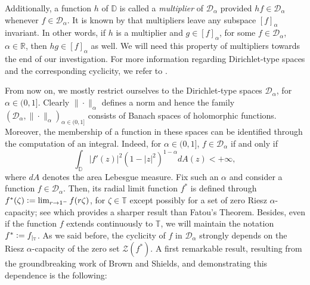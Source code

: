 \documentclass[12pt]{amsart}
\theoremstyle{definition}\newtheorem{remark}[theorem]{Remark}
\theoremstyle{definition}\newtheorem{example}[theorem]{Example}
\theoremstyle{definition}\newtheorem{definition}{Definition}
\numberwithin{equation}{section}
\newcommand\cD{{\mathcal D}}
\newcommand\RR{{\mathbb R}}
\newcommand\DD{{\mathbb D}}
\newcommand\TT{{\mathbb T}}
\begin{document}
Additionally, a function $h$ of $\DD$ is called a \textit{multiplier} of $\cD_\alpha$ provided $hf\in\cD_\alpha$ whenever $f\in\cD_\alpha$. It is known by \cite[Proposition 7]{Brown-Shields} that multipliers leave any subspace $[f]_\alpha$ invariant. In other words, if $h$ is a multiplier and $g\in[f]_\alpha$, for some $f\in\cD_\alpha$, $\alpha\in\RR$, then $hg\in[f]_\alpha$ as well. We will need this property of multipliers towards the end of our investigation. For more information regarding Dirichlet-type spaces and the corresponding cyclicity, we refer to \cite{Aleman1, Beurling, Brown-Shields, Primer, Mironov, Richter1, Richter-Shields, Richter, Ross, Sampat, Taylor}.

From now on, we mostly restrict ourselves to the Dirichlet-type spaces $\cD_\alpha$, for $\alpha\in(0,1]$. Clearly $\|\cdot\|_\alpha$ defines a norm and hence the family $(\cD_\alpha,\|\cdot\|_\alpha)_{\alpha\in (0,1]}$ consists of Banach spaces of holomorphic functions.  Moreover, the membership of a function in these spaces can be identified through the computation of an integral. Indeed, for $\alpha\in(0,1]$, $f\in\cD_\alpha$ if and only if
\begin{equation}\label{eq:integral}
    \int_{\DD}|f'(z)|^2(1-|z|^2)^{1-\alpha}dA(z)<+\infty,
\end{equation}
where $dA$ denotes the area Lebesgue measure. Fix such an $\alpha$ and consider a function $f\in\cD_\alpha$. Then, its radial limit function $f^*$ is defined through $f^*(\zeta)\vcentcolon=\lim_{r\to1^-}f(r\zeta)$, for $\zeta\in\TT$ except possibly for a set of zero Riesz $\alpha$-capacity; see \cite[\S V, Theorem 3]{Carleson} which provides a sharper result than Fatou's Theorem. Besides, even if the function $f$ extends continuously to $\TT$, we will maintain the notation $f^*\vcentcolon=f_{|_{\TT}}$. As we said before, the cyclicity of $f$ in $\cD_\alpha$ strongly depends on the Riesz $\alpha$-capacity of the zero set $\mathcal{Z}(f^*)$. A first remarkable result, resulting from the groundbreaking work of Brown and Shields, and demonstrating this dependence is the following:
\end{document}
